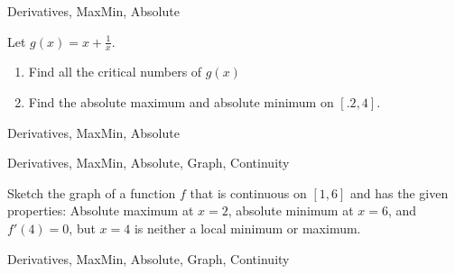 

	
\begin{tagblock}{Derivatives, MaxMin, Absolute}
\begin{question}
	


 Let $g(x) = x + \frac{1}{x}$.
\begin{enumerate}
\item Find all the critical numbers of $g(x)$ 

\vspace{1.5in}
\item Find the absolute maximum and absolute minimum on $[.2,4]$.  
\end{enumerate}




	
\begin{tags}
	   Derivatives, MaxMin, Absolute
\end{tags}
	
\begin{diary}
\end{diary}
	
\begin{solution}
	   
\end{solution}
	
\end{question}

\end{tagblock}



	
\begin{tagblock}{Derivatives, MaxMin, Absolute, Graph, Continuity}
\begin{question}
	


Sketch the graph of a function $f$ that is continuous on $[1, 6]$ and has the given properties:  Absolute maximum at $x=2$, absolute minimum at $x=6$, and $f'(4)=0$, but $x=4$ is neither a local minimum or maximum.




	
\begin{tags}
	   Derivatives, MaxMin, Absolute, Graph, Continuity
\end{tags}
	
\begin{diary}
\end{diary}
	
\begin{solution}
	   
\end{solution}
	
\end{question}

\end{tagblock}

